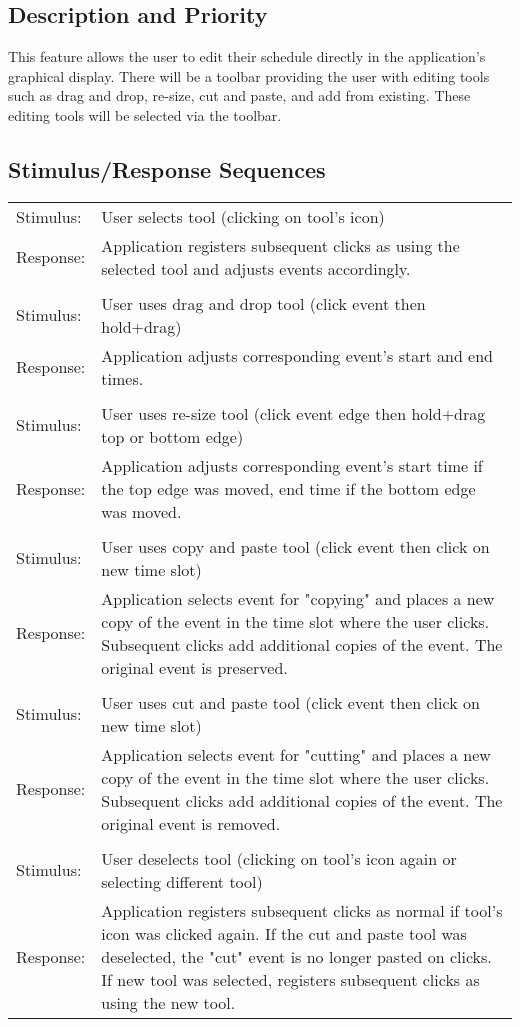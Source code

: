 \documentclass{scrreprt}
\begin{document}
\subsection{Description and Priority}
This feature allows the user to edit their schedule directly in the application's
graphical display. There will be a toolbar providing the user with editing tools
such as drag and drop, re-size, cut and paste, and add from existing. These editing
tools will be selected via the toolbar.

\subsection{Stimulus/Response Sequences}
\begin{center}
    \begin{tabular}{ p{2cm} p{13cm} }
    Stimulus: & User selects tool (clicking on tool's icon)\\
    Response: & Application registers subsequent clicks as using the selected tool and 
    adjusts events accordingly.\\
    \\
    Stimulus: & User uses drag and drop tool (click event then hold+drag)\\
    Response: & Application adjusts corresponding event's start and end times.\\
    \\
    Stimulus: & User uses re-size tool (click event edge then hold+drag top or bottom edge)\\
    Response: & Application adjusts corresponding event's start time if the top
    edge was moved, end time if the bottom edge was moved.\\
    \\
    Stimulus: & User uses copy and paste tool (click event then click on new time slot)\\
    Response: & Application selects event for "copying" and places a new copy of the event
    in the time slot where the user clicks. Subsequent clicks add additional copies of 
    the event. The original event is preserved.\\
    \\
    Stimulus: & User uses cut and paste tool (click event then click on new time slot)\\
    Response: & Application selects event for "cutting" and places a new copy of the event 
    in the time slot where the user clicks. Subsequent clicks add additional copies of 
    the event. The original event is removed.\\
    \\
    Stimulus: & User deselects tool (clicking on tool's icon again or selecting different tool)\\
    Response: & Application registers subsequent clicks as normal if tool's icon
    was clicked again. If the cut and paste tool was deselected, the "cut" event 
    is no longer pasted on clicks. If new tool was selected, registers subsequent clicks as 
    using the new tool. 
    \end{tabular}
\end{center}
\end{document}

